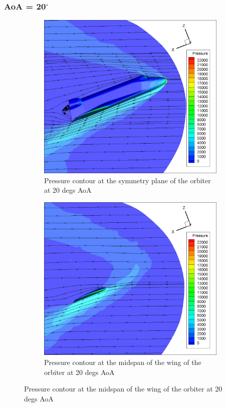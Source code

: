 \subsubsection{AoA = 20$^\circ$}
\begin{figure}[H]

	\centering
    \begin{subfigure}[b]{0.65\textwidth}
         \centering
		 \includegraphics[width=\textwidth]{report_images/20_sym_pressure_contour.png}
		 \caption{Pressure contour at the symmetry plane of the orbiter at 20 degs AoA}
		 \label{fig: 20_sym_pressure_contour}
    \end{subfigure} 
    \begin{subfigure}[b]{0.65\textwidth}
         \centering
		 \includegraphics[width=\textwidth]{report_images/20_wing_pressure_contour.png}
		 \caption{Pressure contour at the midspan of the wing of the orbiter at 20 degs AoA}
		 \label{fig: 20_wing_pressure_contour}
    \end{subfigure}
\end{figure}

